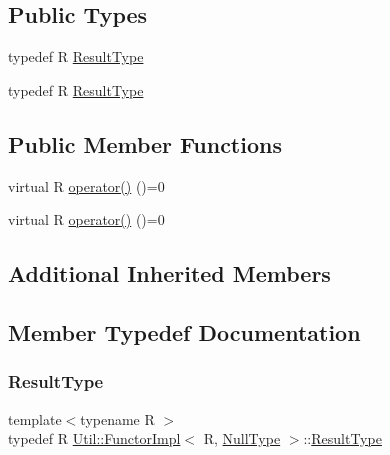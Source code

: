 \subsection*{Public Types}
\begin{DoxyCompactItemize}
\item 
typedef R \mbox{\hyperlink{classUtil_1_1FunctorImpl_3_01R_00_01NullType_01_4_a082742999a1f3173c7907c2322861fe5}{Result\+Type}}
\item 
typedef R \mbox{\hyperlink{classUtil_1_1FunctorImpl_3_01R_00_01NullType_01_4_a082742999a1f3173c7907c2322861fe5}{Result\+Type}}
\end{DoxyCompactItemize}
\subsection*{Public Member Functions}
\begin{DoxyCompactItemize}
\item 
virtual R \mbox{\hyperlink{classUtil_1_1FunctorImpl_3_01R_00_01NullType_01_4_a91bac1d58b637b1b4bd5e5da7ebb8c82}{operator()}} ()=0
\item 
virtual R \mbox{\hyperlink{classUtil_1_1FunctorImpl_3_01R_00_01NullType_01_4_a91bac1d58b637b1b4bd5e5da7ebb8c82}{operator()}} ()=0
\end{DoxyCompactItemize}
\subsection*{Additional Inherited Members}


\subsection{Member Typedef Documentation}
\mbox{\label{classUtil_1_1FunctorImpl_3_01R_00_01NullType_01_4_a082742999a1f3173c7907c2322861fe5}} 
\subsubsection{\texorpdfstring{ResultType}{ResultType}\hspace{0.1cm}{\footnotesize\ttfamily [1/2]}}
{\footnotesize\ttfamily template$<$typename R $>$ \\
typedef R \mbox{\hyperlink{classUtil_1_1FunctorImpl}{Util\+::\+Functor\+Impl}}$<$ R, \mbox{\hyperlink{classUtil_1_1NullType}{Null\+Type}} $>$\+::\mbox{\hyperlink{structUtil_1_1Private_1_1FunctorImplBase_a5e95fd30fdd89f3c5080b68ab5891bc3}{Result\+Type}}}

